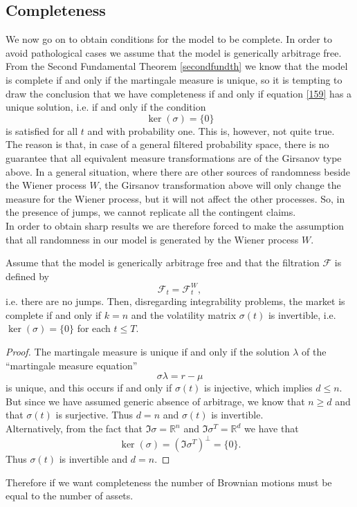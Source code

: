 \subsection{Completeness}
We now go on to obtain conditions for the model to be complete. In order to avoid pathological cases we assume that the model is generically arbitrage free. From the Second Fundamental Theorem \ref{secondfundth} we know that the model is complete if and only if the martingale measure is unique, so it is tempting to draw the conclusion that we have completeness if and only if equation \eqref{159} has a unique solution, i.e. if and only if the condition
\begin{equation}
    \ker(\sigma) = \{0\}
\end{equation}
is satisfied for all $t$ and with probability one. This is, however, not quite true. The reason is that, in case of a general filtered probability space, there is no guarantee that all equivalent measure transformations are of the Girsanov type above. In a general situation, where there are other sources of randomness beside the Wiener process $W$, the Girsanov transformation above will only change the measure for the Wiener process, but it will not affect the other processes. So, in the presence of jumps, we cannot replicate all the contingent claims.\\
In order to obtain sharp results we are therefore forced to make the assumption that all randomness in our model is generated by the Wiener process $W$.
\begin{theorem}
    Assume that the model is generically arbitrage free and that the filtration $\mathcal{F}$ is defined by
    \begin{equation}
        \mathcal{F}_t = \mathcal{F}_t^W,
    \end{equation}
    i.e. there are no jumps. Then, disregarding integrability problems, the market is complete if and only if $k = n$ and the volatility matrix $\sigma(t)$ is invertible, i.e. $\ker(\sigma) = \{0\}$ for each $t\le T$.
\end{theorem}
\begin{proof}
    The martingale measure is unique if and only if the solution $\lambda$ of the “martingale measure equation”
    \begin{equation*}
        \sigma\lambda=r-\mu
    \end{equation*}
    is unique, and this occurs if and only if $\sigma(t)$ is injective, which implies $d \le n$. But since we have assumed generic absence of arbitrage, we know that $n \ge d$ and that $\sigma(t)$ is surjective. Thus $d = n$ and $\sigma(t)$ is invertible. \\
    Alternatively, from the fact that $\Im{\sigma}=\mathbb{R}^n$ and $\Im{\sigma^T}=\mathbb{R}^d$ we have that
    \begin{equation*}
        \ker(\sigma) = (\Im{\sigma^T})^{\perp} = \{0\}.
    \end{equation*}
    Thus $\sigma(t)$ is invertible and $d = n$.
\end{proof}
Therefore if we want completeness the number of Brownian motions must be equal to the number of assets.

